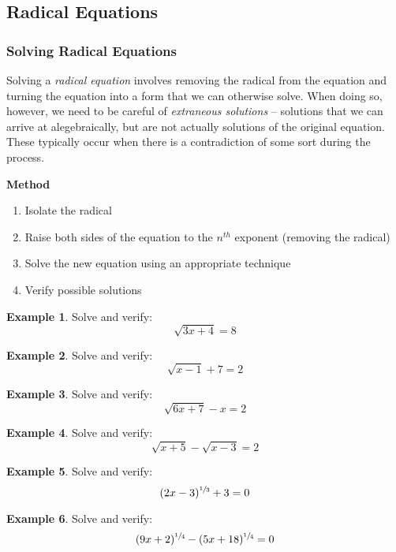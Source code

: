 \documentclass[addpoints,12pt]{exam}
\theoremstyle{definition}
\newtheorem{example}{Example}[subsection]
\begin{document}
\setcounter{section}{10}
\setcounter{subsection}{5}

\subsection{Radical Equations}

\subsubsection*{Solving Radical Equations}

Solving a \emph{radical equation} involves removing the radical from the equation and turning the equation into a form that we can otherwise solve. When doing so, however, we need to be careful of \emph{extraneous solutions} -- solutions that we can arrive at alegebraically, but are not actually solutions of the original equation. These typically occur when there is a contradiction of some sort during the process.

\vspace{.2in}

\begin{mdframed}
\textbf{Method}
\begin{enumerate}
\item Isolate the radical
\item Raise both sides of the equation to the $n^{th}$ exponent (removing the radical)
\item Solve the new equation using an appropriate technique
\item Verify possible solutions
\end{enumerate}
\end{mdframed}

\vspace{.25in}

\begin{example}
Solve and verify: \[\sqrt{3x+4}=8\]
\vspace{1.5in}
\end{example}

\begin{example}
Solve and verify: \[\sqrt{x-1}+7=2\]
\vspace{1.5in}
\end{example}

\begin{example}
Solve and verify: \[\sqrt{6x+7}-x=2\]
\vspace{2in}
\end{example}

\begin{example}
Solve and verify: \[\sqrt{x+5}-\sqrt{x-3}=2\]
\vspace{2.5in}
\end{example}

\newpage
\begin{example}
Solve and verify: \[(2x-3)^{\sfrac{1}{3}}+3=0\]
\vspace{2in}
\end{example}

\begin{example}
Solve and verify: \[(9x+2)^{\sfrac{1}{4}}-(5x+18)^{\sfrac{1}{4}}=0\]
\vspace{2in}
\end{example}
\end{document}
